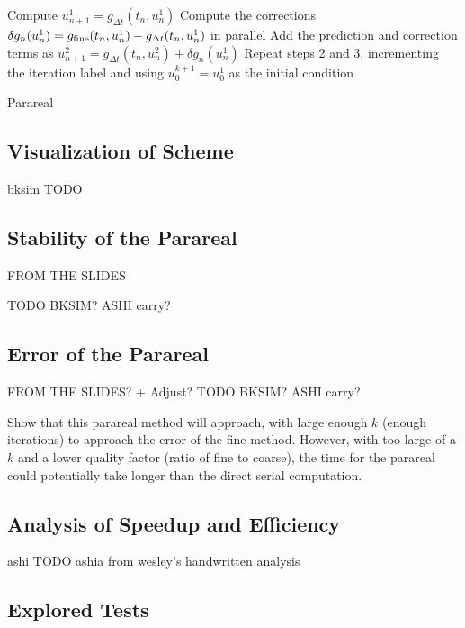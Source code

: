\documentclass[letterpaper,12pt]{article}
\begin{document}
\begin{algorithm}[t]
    Compute $u^1_{n+1} = g_{\Delta t}(t_n, u^1_n)$\;
    Compute the corrections $\delta g_n(u^1_n) = g_{\textnormal{fine}}(t_n,
    u^1_n) - g_{\Delta t}(t_n, u^1_n)$ in parallel\;
    Add the prediction and correction terms as $u^2_{n+1} = g_{\Delta t}(t_n,
    u^2_n) + \delta g_n(u^1_n)$\;
    Repeat steps 2 and 3, incrementing the iteration label and using $u^{k+1}_0
    = u^1_0$ as the initial condition\;
 \caption{Parareal}
 \label{alg:parareal}
\end{algorithm}

\subsection{Visualization of Scheme}

bksim TODO

\subsection{Stability of the Parareal}

FROM THE SLIDES 

TODO BKSIM? ASHI carry?

\subsection{Error of the Parareal}

FROM THE SLIDES? + Adjust?
TODO BKSIM? ASHI carry?

Show that this parareal method will approach, with large enough $k$ (enough
iterations) to approach the error of the fine method. However, with too large of
a $k$ and a lower quality factor (ratio of fine to coarse), the time for the
parareal could potentially take longer than the direct serial computation.

\subsection{Analysis of Speedup and Efficiency}

ashi TODO ashia from wesley's handwritten analysis

\subsection{Explored Tests}
\end{document}
